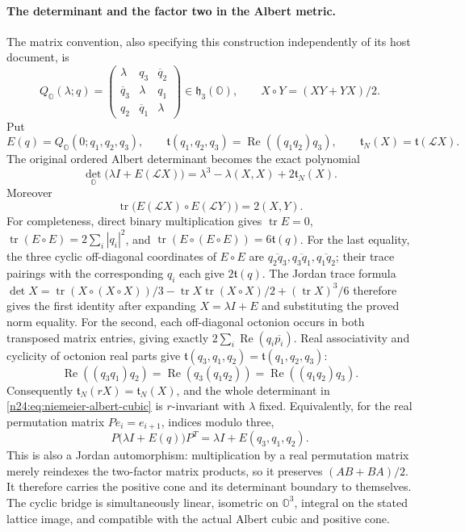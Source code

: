 \paragraph{The determinant and the factor two in the Albert metric.}
The matrix convention, also specifying this construction independently
of its host document, is
\[
 Q_{\mathbb O}(\lambda;q)=
 \begin{pmatrix}
 \lambda&q_3&\overline q_2\\
 \overline q_3&\lambda&q_1\\
 q_2&\overline q_1&\lambda
 \end{pmatrix}\in\mathfrak h_3(\mathbb O),\qquad
 X\circ Y=(XY+YX)/2.
\]
Put
\[
 E(q)=Q_{\mathbb O}(0;q_1,q_2,q_3),\qquad
 \mathfrak t(q_1,q_2,q_3)=\operatorname{Re}((q_1q_2)q_3),
 \qquad \mathfrak t_N(X)=\mathfrak t(\mathcal LX).
\]
The original ordered Albert determinant becomes the exact polynomial
\begin{equation}
 \det_{\mathbb O}\bigl(\lambda I+E(\mathcal LX)\bigr)
   =\lambda^3-\lambda(X,X)+2\mathfrak t_N(X).
 \label{n24:eq:niemeier-albert-cubic}
\end{equation}
Moreover
\begin{equation}
 \operatorname{tr}\bigl(E(\mathcal LX)\circ E(\mathcal LY)\bigr)
                  =2(X,Y).
 \label{n24:eq:albert-metric-two}
\end{equation}
For completeness, direct binary multiplication gives
$\operatorname{tr}E=0$, $\operatorname{tr}(E\circ E)=2\sum_i|q_i|^2$,
and $\operatorname{tr}(E\circ(E\circ E))=6\mathfrak t(q)$.
For the last equality, the three cyclic off-diagonal coordinates of
$E\circ E$ are $\overline{q_2q_3},\overline{q_3q_1},
\overline{q_1q_2}$; their trace pairings with the corresponding
$q_i$ each give $2\mathfrak t(q)$.
The Jordan trace formula
$\det X=\operatorname{tr}(X\circ(X\circ X))/3
-\operatorname{tr}X\operatorname{tr}(X\circ X)/2
+(\operatorname{tr}X)^3/6$
therefore gives the first identity after expanding $X=\lambda I+E$
and substituting the proved norm equality. For the second,
each off-diagonal octonion
occurs in both transposed matrix entries, giving exactly
\(2\sum_i\operatorname{Re}(q_i\overline{p_i})\).
Real associativity and cyclicity of octonion real parts give
\(\mathfrak t(q_3,q_1,q_2)=\mathfrak t(q_1,q_2,q_3)\):
\[
 \operatorname{Re}((q_3q_1)q_2)
 =\operatorname{Re}(q_3(q_1q_2))
 =\operatorname{Re}((q_1q_2)q_3).
\]
Consequently \(\mathfrak t_N(rX)=\mathfrak t_N(X)\), and the
whole determinant in \eqref{n24:eq:niemeier-albert-cubic} is
\(r\)-invariant with \(\lambda\) fixed.  Equivalently, for the real
permutation matrix \(P e_i=e_{i+1}\), indices modulo three,
\[
 P\bigl(\lambda I+E(q)\bigr)P^T
             =\lambda I+E(q_3,q_1,q_2).
\]
This is also a Jordan automorphism: multiplication by a real
permutation matrix merely reindexes the two-factor matrix products,
so it preserves \((AB+BA)/2\).  It therefore carries the positive
cone and its determinant boundary to themselves.  The cyclic bridge
is simultaneously linear, isometric on \(\mathbb O^3\), integral
on the stated lattice image, and compatible with the actual Albert
cubic and positive cone.

